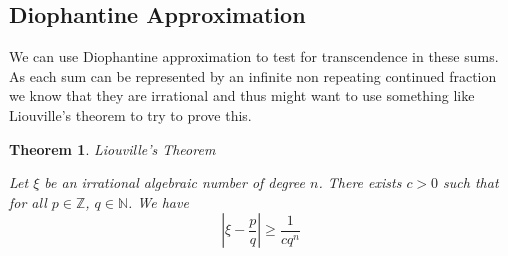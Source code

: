 \documentclass{article}
\newtheorem{theorem}{Theorem}[section]
\theoremstyle{remark}
\theoremstyle{definition}
\begin{document}
\subsection{Diophantine Approximation}

We can use Diophantine approximation to test for transcendence in these sums. As each sum can be represented by an infinite non repeating continued fraction we know that they are irrational and thus might want to use something like Liouville's theorem to try to prove this.
\begin{theorem}{Liouville's Theorem}\label{trancsendence.liouville}

    Let $\xi$ be an irrational algebraic number of degree $n$. There exists $c>0$ such that for all $p \in \mathbb{Z}$, $q \in \mathbb{N}$. We have
    \begin{equation}\label{trancsendence.liouville.eq}
        \left| \xi - \frac{p}{q} \right| \geq \frac{1}{cq^n}
    \end{equation}
\end{theorem}
\end{document}
